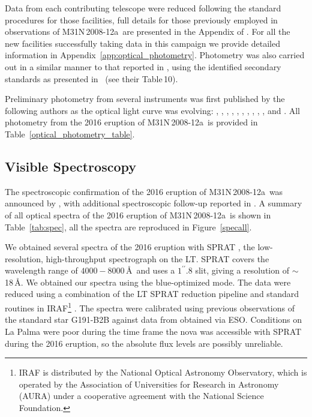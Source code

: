 \documentclass[twocolumn,tighten]{aastex6}
\def\novak{{M31N\,2008-12a}}
\newcommand{\othreek}{\citetalias{2016ApJ...833..149D}}
\begin{document}
Data from each contributing telescope were reduced following the standard procedures for those facilities, full details for those previously employed in observations of \novak\ are presented in the Appendix of \othreek. For all the new facilities successfully taking data in this campaign we provide detailed information in Appendix~\ref{app:optical_photometry}. Photometry was also carried out in a similar manner to that reported in \othreek, using the identified secondary standards as presented in \othreek\ (see their Table\,10).

Preliminary photometry from several instruments was first published by the following authors as the optical light curve was evolving: \citet{2016ATel.9848....1I}, \citet{2016ATel.9857....1E},  \citet{2016ATel.9861....1B}, \citet{2016ATel.9864....1S}, \citet{2016ATel.9874....1D}, \citet{2016ATel.9881....1K}, \citet{2016ATel.9883....1H}, \citet{2016ATel.9885....1T}, \citet{2016ATel.9891....1N}, \citet{2016ATel.9906....1D}, and \citet{2016ATel.9910....1D}.  All photometry from the 2016 eruption of \novak\ is provided in Table~\ref{optical_photometry_table}.

\subsection{Visible Spectroscopy}\label{optical_spectroscopy} 

The spectroscopic confirmation of the 2016 eruption of \novak\ was announced by \citet{2016ATel.9852....1D}, with  additional spectroscopic follow-up reported in \citet{2016ATel.9865....1P}. A summary of all optical spectra of the 2016 eruption of \novak\ is shown in Table~{\ref{tab:spec}}, all the spectra are reproduced in Figure~\ref{specall}.

We obtained several spectra of the 2016 eruption with SPRAT \citep{2014SPIE.9147E..8HP}, the low-resolution, high-throughput spectrograph on the LT. SPRAT covers the wavelength range of $4000-8000$\,\AA\ and uses a $1^{\prime\prime}\!\!.8$ slit, giving a resolution of $\sim$18\,\AA. We obtained our spectra using the blue-optimized mode. The data were reduced using a combination of the LT SPRAT reduction pipeline and standard routines in IRAF\footnote{IRAF is distributed by the National Optical Astronomy Observatory, which is operated by the Association of Universities for Research in Astronomy (AURA) under a cooperative agreement with the National Science Foundation.} \citep{1993ASPC...52..173T}. The spectra were calibrated using previous observations of the standard star G191-B2B against data from \citet{1990AJ.....99.1621O} obtained via ESO. Conditions on La Palma were poor during the time frame the nova was accessible with SPRAT during the 2016 eruption, so the absolute flux levels are possibly unreliable.
\end{document}
